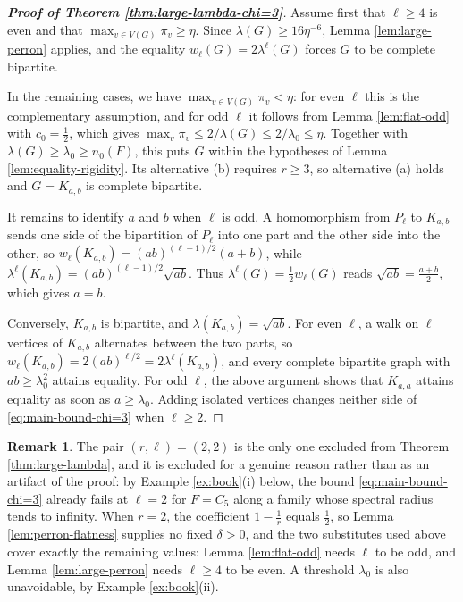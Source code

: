 \documentclass[11pt, a4paper]{article}
\theoremstyle{definition}
\newtheorem{remark}{Remark}
\theoremstyle{plain}
\renewcommand{\le}{\leqslant}
\renewcommand{\ge}{\geqslant}
\begin{document}
\begin{proof}[{\bf Proof of Theorem
\ref{thm:large-lambda-chi=3}}]
Assume first that $\ell \ge 4$ is even and that
$\max_{v\in V(G)}\pi_v\ge \eta$. Since
$\lambda (G)\ge 16\eta^{-6}$, Lemma
\ref{lem:large-perron} applies, and the equality
$w_\ell (G)=2\lambda^{\ell}(G)$ forces $G$ to be complete
bipartite.

In the remaining cases, we have
$\max_{v\in V(G)}\pi_v<\eta$: for even $\ell$ this is the
complementary assumption, and for odd $\ell$ it follows
from Lemma \ref{lem:flat-odd} with $c_0=\frac12$, which
gives $\max_v\pi_v\le 2/\lambda (G)\le 2/\lambda_0\le
\eta$. Together with $\lambda (G)\ge \lambda_0\ge n_0(F)$,
this puts $G$ within the hypotheses of Lemma
\ref{lem:equality-rigidity}. Its alternative (b) requires
$r\ge 3$, so alternative (a) holds and $G=K_{a,b}$ is
complete bipartite.

It remains to identify $a$ and $b$ when $\ell$ is odd. A
homomorphism from $P_\ell$ to $K_{a,b}$ sends one side of
the bipartition of $P_\ell$ into one part and the other
side into the other, so
$w_\ell (K_{a,b})=(ab)^{(\ell -1)/2}(a+b)$, while
$\lambda^{\ell}(K_{a,b})=(ab)^{(\ell -1)/2}\sqrt{ab}$.
Thus $\lambda^\ell (G)=\frac12w_\ell (G)$ reads
$\sqrt{ab}=\frac{a+b}{2}$, which gives $a=b$.

Conversely, $K_{a,b}$ is bipartite, and
$\lambda (K_{a,b})=\sqrt{ab}$. For even $\ell$, a walk on $\ell$ vertices of $K_{a,b}$ alternates between the two parts, so $w_\ell (K_{a,b})=2(ab)^{\ell /2}
=2\lambda^{\ell}(K_{a,b})$, and every complete bipartite graph with $ab\ge \lambda_0^2$ attains equality. For odd $\ell$, the  above argument shows that $K_{a,a}$ attains
equality as soon as $a\ge \lambda_0$. Adding isolated vertices changes
neither side of \eqref{eq:main-bound-chi=3} when
$\ell \ge 2$.
\end{proof}

\begin{remark} 
\label{rem:parity}
The pair $(r,\ell )=(2,2)$ is the only one excluded from
Theorem \ref{thm:large-lambda}, and it is excluded for a
genuine reason rather than as an artifact of the proof: by
Example \ref{ex:book}(i) below, the bound
\eqref{eq:main-bound-chi=3} already fails at $\ell =2$ for
$F=C_5$ along a family whose spectral radius tends to
infinity. When $r=2$, the coefficient $1-\frac1r$ equals
$\frac12$, so Lemma \ref{lem:perron-flatness} supplies no
fixed $\delta >0$, and the two substitutes used above
cover exactly the remaining values: Lemma
\ref{lem:flat-odd} needs $\ell$ to be odd, and Lemma
\ref{lem:large-perron} needs $\ell \ge 4$ to be even. A
threshold $\lambda_0$ is also unavoidable, by Example
\ref{ex:book}(ii).
\end{remark}
\end{document}
